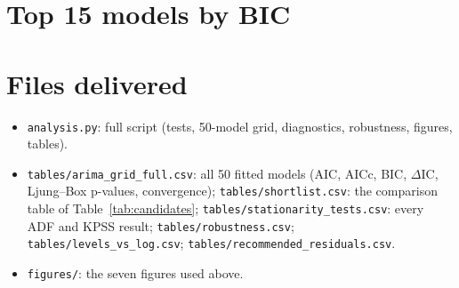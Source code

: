 \documentclass[11pt,a4paper]{article}
\begin{document}
\appendix
\section{Top 15 models by BIC}\label{app:top15}


\section{Files delivered}
\sloppy
\begin{itemize}
\item \texttt{analysis.py}: full script (tests, 50-model grid, diagnostics, robustness, figures, tables).
\item \texttt{tables/arima\_grid\_full.csv}: all 50 fitted models (AIC, AICc, BIC, $\Delta$IC, Ljung--Box p-values, convergence); \texttt{tables/shortlist.csv}: the comparison table of Table~\ref{tab:candidates}; \texttt{tables/stationarity\_tests.csv}: every ADF and KPSS result; \texttt{tables/robustness.csv}; \texttt{tables/levels\_vs\_log.csv}; \texttt{tables/recommended\_residuals.csv}.
\item \texttt{figures/}: the seven figures used above.
\end{itemize}
\end{document}
